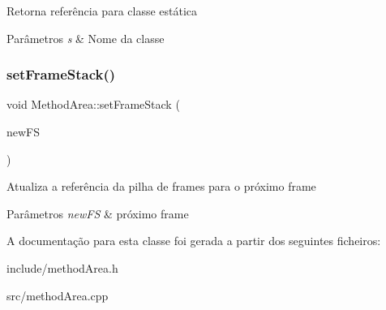 Retorna referência para classe estática


\begin{DoxyParams}{Parâmetros}
{\em s} & Nome da classe \\
\hline
\end{DoxyParams}
\mbox{\label{classMethodArea_af072c9b681a57a35a713b86fa61984d2}} 
\subsubsection{\texorpdfstring{set\+Frame\+Stack()}{setFrameStack()}}
{\footnotesize\ttfamily void Method\+Area\+::set\+Frame\+Stack (\begin{DoxyParamCaption}\item[{\hyperlink{classFrameStack}{Frame\+Stack} $\ast$}]{new\+FS }\end{DoxyParamCaption})\hspace{0.3cm}{\ttfamily [static]}}

Atualiza a referência da pilha de frames para o próximo frame


\begin{DoxyParams}{Parâmetros}
{\em new\+FS} & próximo frame \\
\hline
\end{DoxyParams}


A documentação para esta classe foi gerada a partir dos seguintes ficheiros\+:\begin{DoxyCompactItemize}
\item 
include/method\+Area.\+h\item 
src/method\+Area.\+cpp\end{DoxyCompactItemize}

